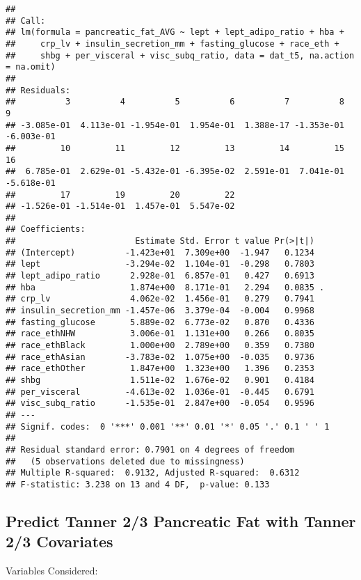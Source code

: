 \documentclass[
]{article}
\begin{document}
\begin{verbatim}
## 
## Call:
## lm(formula = pancreatic_fat_AVG ~ lept + lept_adipo_ratio + hba + 
##     crp_lv + insulin_secretion_mm + fasting_glucose + race_eth + 
##     shbg + per_visceral + visc_subq_ratio, data = dat_t5, na.action = na.omit)
## 
## Residuals:
##          3          4          5          6          7          8          9 
## -3.085e-01  4.113e-01 -1.954e-01  1.954e-01  1.388e-17 -1.353e-01 -6.003e-01 
##         10         11         12         13         14         15         16 
##  6.785e-01  2.629e-01 -5.432e-01 -6.395e-02  2.591e-01  7.041e-01 -5.618e-01 
##         17         19         20         22 
## -1.526e-01 -1.514e-01  1.457e-01  5.547e-02 
## 
## Coefficients:
##                        Estimate Std. Error t value Pr(>|t|)  
## (Intercept)          -1.423e+01  7.309e+00  -1.947   0.1234  
## lept                 -3.294e-02  1.104e-01  -0.298   0.7803  
## lept_adipo_ratio      2.928e-01  6.857e-01   0.427   0.6913  
## hba                   1.874e+00  8.171e-01   2.294   0.0835 .
## crp_lv                4.062e-02  1.456e-01   0.279   0.7941  
## insulin_secretion_mm -1.457e-06  3.379e-04  -0.004   0.9968  
## fasting_glucose       5.889e-02  6.773e-02   0.870   0.4336  
## race_ethNHW           3.006e-01  1.131e+00   0.266   0.8035  
## race_ethBlack         1.000e+00  2.789e+00   0.359   0.7380  
## race_ethAsian        -3.783e-02  1.075e+00  -0.035   0.9736  
## race_ethOther         1.847e+00  1.323e+00   1.396   0.2353  
## shbg                  1.511e-02  1.676e-02   0.901   0.4184  
## per_visceral         -4.613e-02  1.036e-01  -0.445   0.6791  
## visc_subq_ratio      -1.535e-01  2.847e+00  -0.054   0.9596  
## ---
## Signif. codes:  0 '***' 0.001 '**' 0.01 '*' 0.05 '.' 0.1 ' ' 1
## 
## Residual standard error: 0.7901 on 4 degrees of freedom
##   (5 observations deleted due to missingness)
## Multiple R-squared:  0.9132, Adjusted R-squared:  0.6312 
## F-statistic: 3.238 on 13 and 4 DF,  p-value: 0.133
\end{verbatim}

\hypertarget{predict-tanner-23-pancreatic-fat-with-tanner-23-covariates}{%
\subsection{Predict Tanner 2/3 Pancreatic Fat with Tanner 2/3
Covariates}\label{predict-tanner-23-pancreatic-fat-with-tanner-23-covariates}}

Variables Considered:
\end{document}
